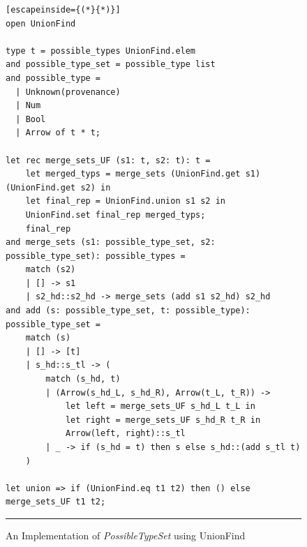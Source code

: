 \begin{figure}[htbp]
\begin{lstlisting}[escapeinside={(*}{*)}]
open UnionFind

type t = possible_types UnionFind.elem
and possible_type_set = possible_type list
and possible_type =
  | Unknown(provenance)
  | Num
  | Bool
  | Arrow of t * t;

let rec merge_sets_UF (s1: t, s2: t): t =
    let merged_typs = merge_sets (UnionFind.get s1) (UnionFind.get s2) in
    let final_rep = UnionFind.union s1 s2 in
    UnionFind.set final_rep merged_typs;
    final_rep
and merge_sets (s1: possible_type_set, s2: possible_type_set): possible_types = 
    match (s2)
    | [] -> s1
    | s2_hd::s2_hd -> merge_sets (add s1 s2_hd) s2_hd
and add (s: possible_type_set, t: possible_type): possible_type_set =
    match (s)
    | [] -> [t]
    | s_hd::s_tl -> (
        match (s_hd, t)
        | (Arrow(s_hd_L, s_hd_R), Arrow(t_L, t_R)) ->
            let left = merge_sets_UF s_hd_L t_L in
            let right = merge_sets_UF s_hd_R t_R in
            Arrow(left, right)::s_tl
        | _ -> if (s_hd = t) then s else s_hd::(add s_tl t)
    )

let union => if (UnionFind.eq t1 t2) then () else merge_sets_UF t1 t2;
\end{lstlisting}
\vspace{-4px}
 \hrule
\caption{An Implementation of \textit{PossibleTypeSet} using UnionFind}
\label{fig:algcode}
\end{figure}